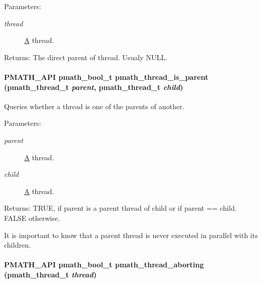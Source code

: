 \begin{Desc}
\item[Parameters:]
\begin{description}
\item[{\em thread}]\hyperlink{class_a}{A} thread. \end{description}
\end{Desc}
\begin{Desc}
\item[Returns:]The direct parent of thread. Usualy NULL. \end{Desc}
\hypertarget{group__threads_g4409c7f042a1809eee72329002635fb9}{
\paragraph[{pmath\_\-thread\_\-is\_\-parent}]{\setlength{\rightskip}{0pt plus 5cm}PMATH\_\-API {\bf pmath\_\-bool\_\-t} pmath\_\-thread\_\-is\_\-parent ({\bf pmath\_\-thread\_\-t} {\em parent}, \/  {\bf pmath\_\-thread\_\-t} {\em child})}\hfill}
\label{group__threads_g4409c7f042a1809eee72329002635fb9}


Queries whether a thread is one of the parents of another. 

\begin{Desc}
\item[Parameters:]
\begin{description}
\item[{\em parent}]\hyperlink{class_a}{A} thread. \item[{\em child}]\hyperlink{class_a}{A} thread. \end{description}
\end{Desc}
\begin{Desc}
\item[Returns:]TRUE, if parent is a parent thread of child or if parent == child. FALSE otherwise.\end{Desc}
It is important to know that a parent thread is never executed in parallel with its children. \hypertarget{group__threads_g3932a5c364197c999dfab0aeb28e8779}{
\paragraph[{pmath\_\-thread\_\-aborting}]{\setlength{\rightskip}{0pt plus 5cm}PMATH\_\-API {\bf pmath\_\-bool\_\-t} pmath\_\-thread\_\-aborting ({\bf pmath\_\-thread\_\-t} {\em thread})}\hfill}
\label{group__threads_g3932a5c364197c999dfab0aeb28e8779}


